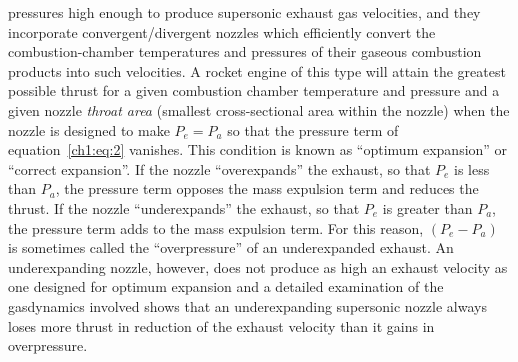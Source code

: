 pressures high enough to produce supersonic exhaust gas velocities, and they incorporate
convergent/divergent nozzles which efficiently convert the combustion-chamber temperatures and
pressures of their gaseous combustion products into such velocities. A rocket engine of this type
will attain the greatest possible thrust for a given combustion chamber temperature and pressure
and a given nozzle \emph{throat area} (smallest cross-sectional area within the nozzle) when the
nozzle is designed to make $P_e = P_a$ so that the pressure term of equation~\eqref{ch1:eq:2}
vanishes. This condition is known as ``optimum expansion'' or ``correct expansion''. If the nozzle
``overexpands'' the exhaust, so that $P_e$ is less than $P_a$, the pressure term opposes the mass
expulsion term and reduces the thrust. If the nozzle ``underexpands'' the exhaust, so that $P_e$
is greater than $P_a$, the pressure term adds to the mass expulsion term. For this reason,
$(P_e - P_a)$ is sometimes called the ``overpressure'' of an underexpanded exhaust. An
underexpanding nozzle, however, does not produce as high an exhaust velocity as one designed for
optimum expansion and a detailed examination of the gasdynamics involved shows that an
underexpanding supersonic nozzle always loses more thrust in reduction of the exhaust velocity
than it gains in overpressure.

